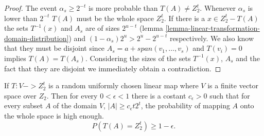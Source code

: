 \begin{proof}
The event $\alpha_s \geq 2^{-t}$ is more probable than $T(A) \neq Z_2^t$. Whenever $\alpha_s$ is lower than $2^{-t}$ $T(A)$ must be the whole space $Z_2^t$. If there is a $x \in Z_2^t - T(A)$ the sets $T^{-1}(x)$ and $A_s$ are of sizes $2^{u-t}$ (lemma \ref{lemma-linear-transformation-domain-distribution}) and $(1 - \alpha_s)2^u > 2^u - 2^{u-t}$ respectively. We also know that they must be disjoint since $A_s = a + span(v_1, \dots, v_s)$ and $T(v_i) = 0$ implies $T(A) = T(A_s)$. Considering the sizes of the sets $T^{-1}(x)$, $A_s$ and the fact that they are disjoint we immediately obtain a contradiction.
\end{proof}

\begin{theorem}
\label{theorem-set-onto-by-linear-transform}
If $T: V -> Z_2^t$ is a random uniformly chosen linear map where $V$ is a finite vector space over $Z_2$. Then for every $0 < \epsilon < 1$ there is a costant $c_\epsilon > 0$ such that for every subset $A$ of the domain $V$, $|A| \geq c_\epsilon t 2^t$, the probability of mapping $A$ onto the whole space is high enough.
\begin{displaymath}
P(T(A) = Z_2^t) \geq 1 - \epsilon \textit{.}
\end{displaymath}
\end{theorem}
